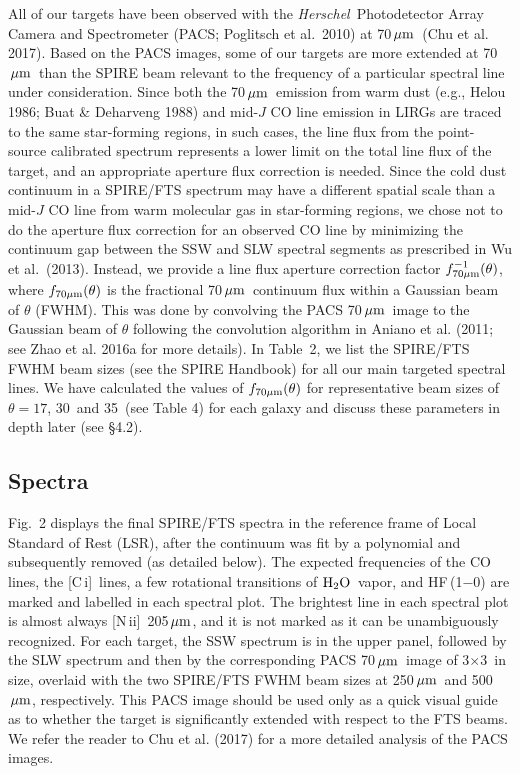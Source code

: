 \documentclass[preprint]{aastex}
\newcommand{\um}{\mbox{$\,\mu{\rm m}$}}
\newcommand{\etal}{et al.~}
\newcommand{\Herschel}{{\it Herschel}}
\newcommand{\Water}{\mbox{${\rm H}_2{\rm O}$}}
\newcommand{\CI}{[C\,{\sc i}]}
\newcommand{\NII}{\mbox{[N\,{\sc ii}]}}
\begin{document}
All of our targets have been observed with the \Herschel\ Photodetector Array Camera 
and Spectrometer (PACS; Poglitsch et al.~2010) at 70\um\ (Chu et al. 2017). 
Based on the PACS images, some of our targets are more extended at 70\um\ than 
the SPIRE beam relevant to the frequency of a particular spectral line under 
consideration.  Since both the 70\um\ emission from warm dust (e.g., Helou 1986; 
Buat \& Deharveng 1988) and mid-$J$ CO line emission in LIRGs are traced to 
the same star-forming regions, in such cases, the line flux from the point-source 
calibrated spectrum represents a lower limit on the total line flux of the target, 
and an appropriate aperture flux correction is needed.  
Since the cold dust continuum in a SPIRE/FTS spectrum may have a different 
spatial scale than a mid-$J$ CO line from warm molecular gas in star-forming
regions, we chose not to do the aperture flux correction for an observed CO 
line by minimizing the continuum gap between the SSW and SLW spectral segments
as prescribed in Wu \etal (2013).  Instead, we provide a line flux aperture 
correction factor $f^{-1}_{70\mu{\rm m}}(\theta)$, where $f_{70\mu{\rm m}}(\theta)$ 
is the fractional 70\um\ continuum flux within a Gaussian beam of $\theta$ (FWHM).
This was done by convolving the PACS 70\um\ image to the Gaussian beam of $\theta$
following the convolution algorithm in Aniano et al. (2011; see Zhao et al. 2016a
for more details). In Table~2, we list the SPIRE/FTS FWHM beam sizes (see the SPIRE
Handbook) for all our main targeted spectral lines. We have calculated the values 
of $f_{70\mu{\rm m}}(\theta)$ for representative beam sizes of $\theta = 17$\arcsec,
30\arcsec\ and 35\arcsec\ (see Table 4) for each galaxy and discuss these parameters
in depth later (see \S4.2).

 


\subsection{Spectra} \label{sec3.3}

Fig.~2 displays the final SPIRE/FTS spectra in the reference frame of Local Standard
of Rest (LSR), after the continuum was fit by a polynomial and subsequently removed 
(as detailed below).  The expected frequencies of the CO lines, the \CI\ lines, 
a few rotational transitions of \Water\ vapor, and HF\,(1$-$0) are marked and labelled
in each spectral plot.   The brightest line in each spectral plot is almost always 
\NII\ 205\um, and it is not marked as it can be unambiguously recognized.  For each 
target, the SSW spectrum is in the upper panel, followed by the SLW spectrum and 
then by the corresponding PACS 70\um\ 
image of 3\arcmin$\times$3\arcmin\ in size, overlaid with the two SPIRE/FTS FWHM beam
sizes at 250\um\ and 500\um, respectively.  This PACS image should be used only as a 
quick visual guide as to whether the target is significantly extended with respect to 
the FTS beams. We refer the reader to Chu et al. (2017) for a more detailed analysis 
of the PACS images.
 
\end{document}
